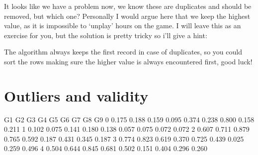 \documentclass[letterpaper,10pt,english]{jupyterBook}
\begin{document}
\sphinxAtStartPar
It looks like we have a problem now, we know these are duplicates and should be removed, but which one?
Personally I would argue here that we keep the highest value, as it is impossible to ‘unplay’ hours on the game.
I will leave this as an exercise for you, but the solution is pretty tricky so i’ll give a hint:

\sphinxAtStartPar
The algorithm always keeps the first record in case of duplicates, so you could sort the rows making sure the higher value is always encountered first, good luck!


\chapter{Outliers and validity}
\label{\detokenize{c2_data_preparation/outliers_validity:outliers-and-validity}}\label{\detokenize{c2_data_preparation/outliers_validity::doc}}
\begin{sphinxVerbatim}[commandchars=\\\{\}]
   
\end{sphinxVerbatim}

\begin{sphinxVerbatim}[commandchars=\\\{\}]
  
\end{sphinxVerbatim}

\begin{sphinxVerbatim}[commandchars=\\\{\}]
      G1     G2     G3     G4     G5     G6     G7     G8     G9
0  0.175  0.188 \PYGZhy{}0.159  0.095  0.374 \PYGZhy{}0.238 \PYGZhy{}0.800  0.158 \PYGZhy{}0.211
1  0.102  0.075  0.141  0.180  0.138 \PYGZhy{}0.057 \PYGZhy{}0.075  0.072  0.072
2  0.607  0.711  0.879  0.765  0.592  0.187  0.431  0.345  0.187
3  0.774  0.823  0.619  0.370  0.725  0.439 \PYGZhy{}0.025 \PYGZhy{}0.259  0.496
4  0.504  0.644  0.845  0.681  0.502  0.151  0.404  0.296  0.260
\end{sphinxVerbatim}

\begin{sphinxVerbatim}[commandchars=\\\{\}]
  
\end{sphinxVerbatim}
\end{document}
